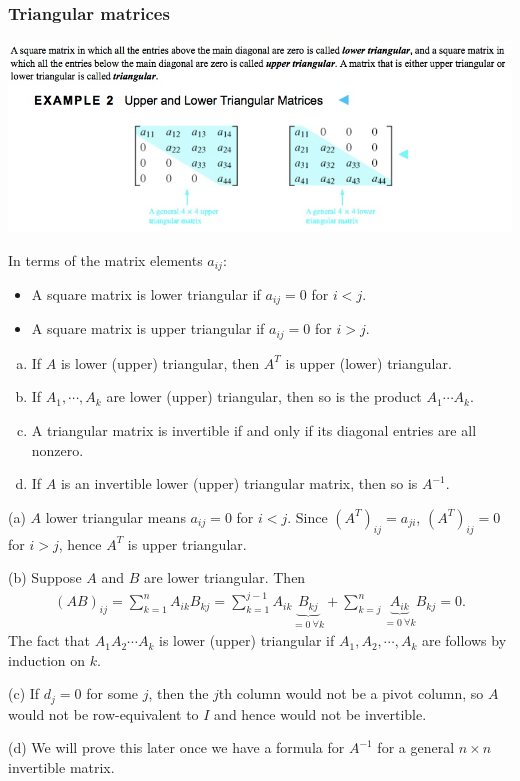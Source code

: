 \documentclass[12pt,letterpaper,reqno]{article}
\numberwithin{equation}{section}
\begin{document}
\subsubsection{Triangular matrices}
	\includegraphics[scale=0.55]{figures_mvc/Triangular_Matrices} 
	
In terms of the matrix elements $a_{ij}$: 
\begin{itemize}
	\item A square matrix is lower triangular if $a_{ij}=0$ for $i<j$.
	\item A square matrix is upper triangular if $a_{ij}=0$ for $i>j$.
\end{itemize}

\begin{thm} \label{thm:properties_of_triangular_matrices} \hspace{10cm}
		\begin{enumerate}[(a)]
	\item If $A$ is lower (upper) triangular, then $A^T$ is upper (lower) triangular.
	\item If $A_1,\cdots, A_k$ are lower (upper) triangular, then so is the product $A_1\cdots A_k$.
	\item A triangular matrix is invertible if and only if its diagonal entries are all nonzero.
	\item If $A$ is an invertible lower (upper) triangular matrix, then so is $A^{-1}$.
	\end{enumerate}
\end{thm}

\begin{pf}
(a) $A$ lower triangular means $a_{ij}=0$ for $i<j$. Since $(A^T)_{ij}=a_{ji}$, $(A^T)_{ij}=0$ for $i>j$, hence $A^T$ is upper triangular. 

(b) Suppose $A$ and $B$ are lower triangular. Then 
\begin{align*}
	(AB)_{ij}=\sum_{k=1}^{n}A_{ik}B_{kj}=\sum_{k=1}^{j-1}A_{ik}\underbrace{B_{kj}}_{=0 \ \forall k}+\sum_{k=j}^{n}\underbrace{A_{ik}}_{=0 \ \forall k}B_{kj}=0.
\end{align*}
The fact that $A_1 A_2 \cdots A_k$ is lower (upper) triangular if $A_1, A_2,\cdots, A_k$ are follows by induction on $k$. 

(c) If $d_j=0$ for some $j$, then the $j$th column would not be a pivot column, so $A$ would not be row-equivalent to $I$ and hence would not be invertible. 

(d) We will prove this later once we have a formula for $A^{-1}$ for a general $n \times n$ invertible matrix.	
\end{pf}
\end{document}
